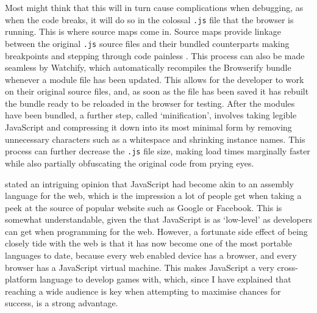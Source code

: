 \documentclass[final]{cmpreport}
\begin{document}

Most might think that this will in turn cause complications when debugging, as when the code breaks, it will do so in the colossal \texttt{.js} file that the browser is running. This is where source maps come in. Source maps provide linkage between the original \texttt{.js} source files and their bundled counterparts making breakpoints and stepping through code painless \citep{Seddon}. This process can also be made seamless by Watchify, which automatically recompiles the Browserify bundle whenever a module file has been updated. This allows for the developer to work on their original source files, and, as soon as the file has been saved it has rebuilt the bundle ready to be reloaded in the browser for testing. After the modules have been bundled, a further step, called `minification', involves taking legible JavaScript and compressing it down into its most minimal form by removing unnecessary characters such as a whitespace and shrinking instance names. This process can further decrease the \texttt{.js} file size, making load times marginally faster while also partially obfuscating the original code from prying eyes.

\cite{Hanselman} stated an intriguing opinion that JavaScript had become akin to an assembly language for the web, which is the impression a lot of people get when taking a peek at the source of popular website such as Google or Facebook. This is somewhat understandable, given the that JavaScript is as `low-level' as developers can get when programming for the web. However, a fortunate side effect of being closely tide with the web is that it has now become one of the most portable languages to date, because every web enabled device has a browser, and every browser has a JavaScript virtual machine. This makes JavaScript a very cross-platform language to develop games with, which, since I have explained that reaching a wide audience is key when attempting to maximise chances for success, is a strong advantage.
\end{document}
